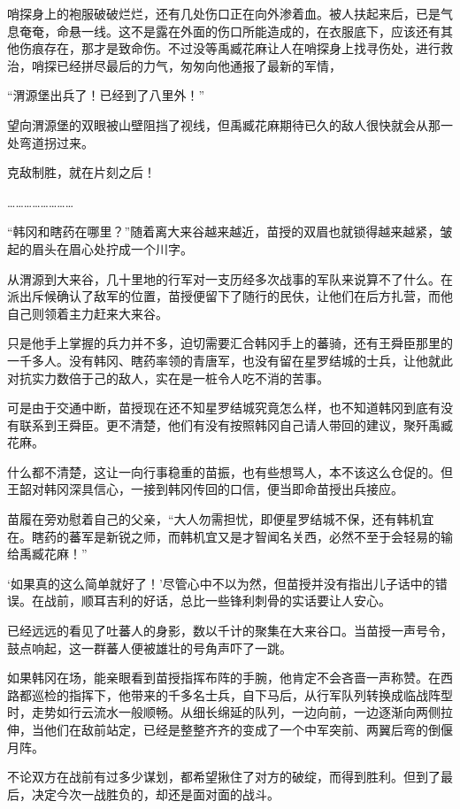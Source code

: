 哨探身上的袍服破破烂烂，还有几处伤口正在向外渗着血。被人扶起来后，已是气息奄奄，命悬一线。这不是露在外面的伤口所能造成的，在衣服底下，应该还有其他伤痕存在，那才是致命伤。不过没等禹臧花麻让人在哨探身上找寻伤处，进行救治，哨探已经拼尽最后的力气，匆匆向他通报了最新的军情，

“渭源堡出兵了！已经到了八里外！”

望向渭源堡的双眼被山壁阻挡了视线，但禹臧花麻期待已久的敌人很快就会从那一处弯道拐过来。

克敌制胜，就在片刻之后！

……………………

“韩冈和瞎药在哪里？”随着离大来谷越来越近，苗授的双眉也就锁得越来越紧，皱起的眉头在眉心处拧成一个川字。

从渭源到大来谷，几十里地的行军对一支历经多次战事的军队来说算不了什么。在派出斥候确认了敌军的位置，苗授便留下了随行的民伕，让他们在后方扎营，而他自己则领着主力赶来大来谷。

只是他手上掌握的兵力并不多，迫切需要汇合韩冈手上的蕃骑，还有王舜臣那里的一千多人。没有韩冈、瞎药率领的青唐军，也没有留在星罗结城的士兵，让他就此对抗实力数倍于己的敌人，实在是一桩令人吃不消的苦事。

可是由于交通中断，苗授现在还不知星罗结城究竟怎么样，也不知道韩冈到底有没有联系到王舜臣。更不清楚，他们有没有按照韩冈自己请人带回的建议，聚歼禹臧花麻。

什么都不清楚，这让一向行事稳重的苗振，也有些想骂人，本不该这么仓促的。但王韶对韩冈深具信心，一接到韩冈传回的口信，便当即命苗授出兵接应。

苗履在旁劝慰着自己的父亲，“大人勿需担忧，即便星罗结城不保，还有韩机宜在。瞎药的蕃军是新锐之师，而韩机宜又是才智闻名关西，必然不至于会轻易的输给禹臧花麻！”

‘如果真的这么简单就好了！’尽管心中不以为然，但苗授并没有指出儿子话中的错误。在战前，顺耳吉利的好话，总比一些锋利刺骨的实话要让人安心。

已经远远的看见了吐蕃人的身影，数以千计的聚集在大来谷口。当苗授一声号令，鼓点响起，这一群蕃人便被雄壮的号角声吓了一跳。

如果韩冈在场，能亲眼看到苗授指挥布阵的手腕，他肯定不会吝啬一声称赞。在西路都巡检的指挥下，他带来的千多名士兵，自下马后，从行军队列转换成临战阵型时，走势如行云流水一般顺畅。从细长绵延的队列，一边向前，一边逐渐向两侧拉伸，当他们在敌前站定，已经是整整齐齐的变成了一个中军突前、两翼后弯的倒偃月阵。

不论双方在战前有过多少谋划，都希望揪住了对方的破绽，而得到胜利。但到了最后，决定今次一战胜负的，却还是面对面的战斗。

